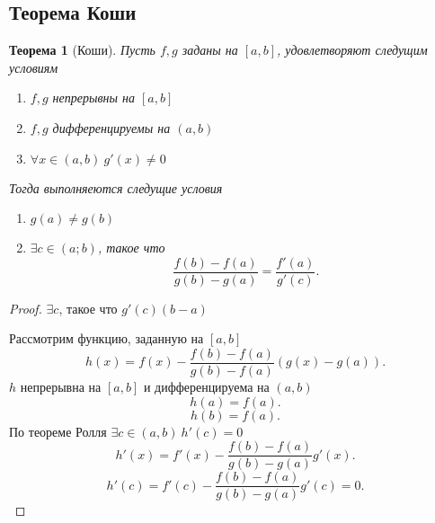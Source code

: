 \documentclass[a4paper]{scrartcl}
\newtheorem{theorem}{Теорема}
\begin{document}
\subsection{Теорема Коши}
\begin{theorem}[Коши]
    Пусть $f, g$ заданы на  $[a,b]$, удовлетворяют следущим условиям
    \begin{enumerate}
        \item $f,g$ непрерывны на  $[a,b]$
        \item  $f,g$ дифференцируемы на  $(a,b)$
        \item $\forall x \in (a,b) ~ g'(x) \neq 0$
    \end{enumerate}
    Тогда выполняеются следущие условия
     \begin{enumerate}
         \item $g(a) \neq g(b)$
            \item $\exists  c \in (a;b)$, такое что
                \[
                \frac{f(b)  - f(a)}{g(b) - g(a)} = \frac{f'(a)}{g'(c)}
                .\] 
    \end{enumerate}
\end{theorem}
\begin{proof}
    $\exists  c$, такое что $g'(c)(b - a)$

    Рассмотрим функцию, заданную на  $[a,b]$
     \[
    h(x) = f(x)  - \frac{f(b) - f(a)}{g(b) - f(a)}(g(x) - g(a))
    .\] 
    $h$ непрерывна на  $[a,b]$ и дифференцируема на  $(a,b)$
     \[
    h(a)  = f(a)
    .\] 
    \[
    h(b) = f(a)
    .\] 
    По теореме Ролля $\exists  c \in (a,b) ~ h'(c) = 0$
    \[
    h'(x) = f'(x) - \frac{f(b) - f(a)}{g(b) - g(a)} g'(x)
    .\] 
    \[
    h'(c) = f'(c) - \frac{f(b) - f(a)}{g(b) - g(a)}g'(c) =  0
    .\] 
\end{proof}
\end{document}
